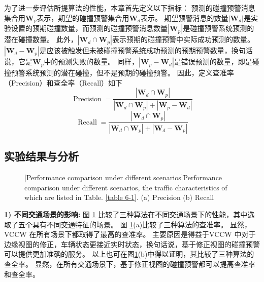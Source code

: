 为了进一步评估所提算法的性能，本章首先定义以下指标：
预测的碰撞预警消息集合用$\mathbf{W}_{p}$表示，期望的碰撞预警集合用$\mathbf{W}_{d}$表示。
期望预警消息的数量$\left| \mathbf{W}_{d} \right|$是实验设置的预期碰撞数量，而预测的碰撞预警消息数量$\left| \mathbf{W}_{p} \right|$是碰撞预警系统预测的潜在碰撞数量。
此外，$\left| \mathbf{W}_{d} \cap \mathbf{W}_{p} \right|$表示预期的碰撞预警中实际成功预测的数量。
$\left| \mathbf{W}_{d} - \mathbf{W}_{p} \right|$是应该被触发但未被碰撞预警系统成功预测的预期预警数量，换句话说，它是$\mathbf{W}_{p}$中的预测失败的数量。
同样，$\left| {\mathbf{W}_{p} - \mathbf{W}_{d}} \right|$是错误预测的数量，即是碰撞预警系统预测的潜在碰撞，但不是预期的碰撞预警。
因此，定义查准率（Precision）和查全率（Recall）如下
\begin{equation}
	\operatorname{Precision} = \frac{{\left| {\mathbf{W}_{d} \cap \mathbf{W}_{p}} \right|}}{{\left| {\mathbf{W}_{d} \cap \mathbf{W}_{p}} \right| + \left| {\mathbf{W}_{p} - \mathbf{W}_{d}} \right|}}
\end{equation}
\begin{equation}
	\operatorname{Recall} = \frac{{\left| {\mathbf{W}_{d} \cap \mathbf{W}_{p}} \right|}}{{\left| {\mathbf{W}_{d} \cap \mathbf{W}_{p}} \right| + \left| {\mathbf{W}_{d} - \mathbf{W}_{p}} \right|}}
\end{equation}

\subsection{实验结果与分析}

\begin{figure}[h]
     \centering
     [Performance comparison under different scenarios]{Performance comparison under different scenarios, the traffic characteristics of which are listed in Table. \ref{table 6-1}. (a) Precision (b) Recall}
     \label{fig 5-5}
\end{figure}

\textbf{1) 不同交通场景的影响:}
图 \ref{fig 5-5} 比较了三种算法在不同交通场景下的性能，其中选取了五个具有不同交通特征的场景。
图 \ref{fig 5-5}(a)比较了三种算法的查准率。
显然，VCCW 在所有场景下都取得了最高的查准率。
主要原因是得益于VCCW 中对于边缘视图的修正，车辆状态更接近实时状态，换句话说，基于修正视图的碰撞预警可以提供更加准确的服务。
以上也可在图\ref{fig 5-5}(b)中得以证明，其比较了三种算法的查全率。
显然，在所有交通场景下，基于修正视图的碰撞预警都可以提高查准率和查全率。

